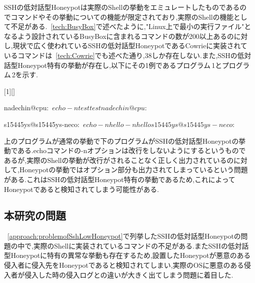 \label{approach:LowHoneypotCommand}
SSHの低対話型Honeypotは実際のShellの挙動をエミュレートしたものであるのでコマンドやその挙動についての機能が限定されており,実際のShellの機能として不足がある.~\ref{tech:BusyBox}で述べたように,"Linux上で最小の実行ファイル"となるよう設計されているBusyBoxに含まれるコマンドの数が200以上あるのに対し,現状で広く使われているSSHの低対話型HoneypotであるCowrieに実装されているコマンドは~\ref{tech:Cowrie}でも述べた通り,38しか存在しない.また,SSHの低対話型Honeypot特有の挙動が存在し,以下にその1例であるプログラム\,1とプログラム\,2を示す.

\vspace{5mm}
[1][]
    {\lstset{
        frame=single,
        basicstyle=\ttfamily,
        numbers=left,
        numbersep=10pt,
        tabsize=2,
        extendedchars=true,
        xleftmargin=17pt,
        framexleftmargin=17pt,
        #1
    }
}{}

\begin{mylisting}[language=sh,caption=正しいShellの挙動]
nadechin@cpu:~$ echo -n test
testnadechin@cpu:~$
\end{mylisting}

\begin{mylisting}[language=sh,caption=Kippo特有の異常な挙動の例]
s15445ys@s15445ys-neco:~$ echo -n hello
-n hello
s15445ys@s15445ys-neco:~$
\end{mylisting}

上のプログラムが通常の挙動で下のプログラムがSSHの低対話型Honeypotの挙動である.echoコマンドの-nオプションは改行をしないようにするというものであるが,実際のShellの挙動が改行がされることなく正しく出力されているのに対して,Honeypotの挙動ではオプション部分も出力されてしまっているという問題がある.これはSSHの低対話型Honeypot特有の挙動であるため,これによってHoneypotであると検知されてしまう可能性がある.


\subsection{本研究の問題}
\label{approach:subproblem}
~\ref{approach:problemofSshLowHoneypot}で列挙したSSHの低対話型Honeypotの問題の中で,実際のShellに実装されているコマンドの不足がある.またSSHの低対話型Honeypotに特有の異常な挙動も存在するため,設置したHoneypotが悪意のある侵入者に侵入先をHoneypotであると検知されてしまい,実際のOSに悪意のある侵入者が侵入した時の侵入ログとの違いが大きく出てしまう問題に着目した.

